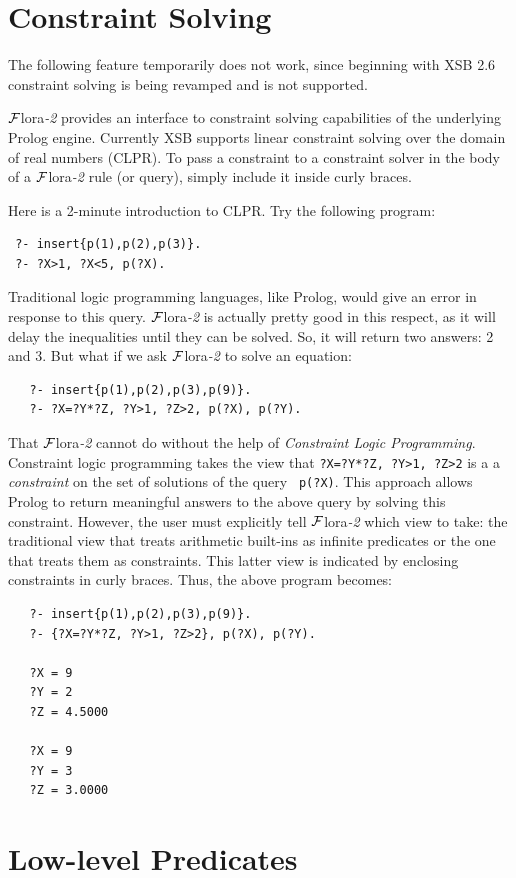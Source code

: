 \documentclass[11pt]{article}
\newcommand{\FLSYSTEM}{{\mbox{\sc ${\cal F}${lora}\rm\emph{-2}}}\xspace}
\begin{document}
\section{Constraint Solving}\label{sec-clp}

The following feature temporarily does not work, since beginning with
XSB 2.6 constraint solving is being revamped and is not supported.

\FLSYSTEM provides an interface to constraint solving capabilities of the
underlying Prolog engine. Currently XSB supports linear constraint solving
over the domain of real numbers (CLPR).
To pass a constraint to a constraint solver in the body of a \FLSYSTEM
rule (or query), simply include it inside curly braces.

Here is a 2-minute introduction to CLPR. Try the following program:
\begin{verbatim}
 ?- insert{p(1),p(2),p(3)}.
 ?- ?X>1, ?X<5, p(?X).
\end{verbatim}
Traditional logic programming languages, like Prolog, would give an error
in response to this query. \FLSYSTEM is actually pretty good in this respect,
as it will delay the inequalities until they can be solved. So, it will
return two answers: 2 and 3. But what if we ask \FLSYSTEM to solve an equation:
\begin{verbatim}
   ?- insert{p(1),p(2),p(3),p(9)}.
   ?- ?X=?Y*?Z, ?Y>1, ?Z>2, p(?X), p(?Y).
\end{verbatim}
That \FLSYSTEM cannot do without the help of 
\emph{Constraint Logic Programming}.
Constraint logic programming takes the view that
\texttt{?X=?Y*?Z, ?Y>1, ?Z>2} is a  
a \emph{constraint} on the set of solutions of the query {\tt
  p(?X)}. This approach allows Prolog to return meaningful answers to the
above query by solving this constraint.
However, the user must explicitly tell \FLSYSTEM which view
  to take: the traditional view that treats arithmetic built-ins as
  infinite predicates or the one that treats them as constraints.
  This latter view is indicated by enclosing constraints in curly
  braces. Thus, the above program becomes:
\begin{verbatim}
   ?- insert{p(1),p(2),p(3),p(9)}.
   ?- {?X=?Y*?Z, ?Y>1, ?Z>2}, p(?X), p(?Y).
  
   ?X = 9
   ?Y = 2
   ?Z = 4.5000

   ?X = 9
   ?Y = 3
   ?Z = 3.0000
\end{verbatim}

\section{Low-level Predicates}
\label{sec-lowlevel}
\end{document}
